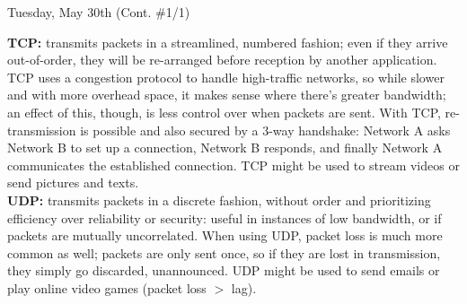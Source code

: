 \documentclass[11pt]{article}
\begin{document}
\begin{bloodorangebox}{Tuesday, May 30th (Cont. \#1/1)\vspace{-2em}\begin{flushright}\large{}\end{flushright}}
\begin{multicols}{2}
        \scriptsize\textbf{TCP:} transmits packets in a streamlined, numbered fashion; even if they arrive out-of-order, they will be re-arranged before reception by another application. TCP uses a congestion protocol to handle high-traffic networks, so while slower and with more overhead space, it makes sense where there's greater bandwidth; an effect of this, though, is less control over when packets are sent. With TCP, re-transmission is possible and also secured by a 3-way handshake: Network A asks Network B to set up a connection, Network B responds, and finally Network A communicates the established connection. TCP might be used to stream videos or send pictures and texts. \\
        \hline
        \vspace{0.75em}
        \scriptsize\textbf{UDP:} transmits packets in a discrete fashion, without order and prioritizing efficiency over reliability or security: useful in instances of low bandwidth, or if packets are mutually uncorrelated. When using UDP, packet loss is much more common as well; packets are only sent once, so if they are lost in transmission, they simply go discarded, unannounced. UDP might be used to send emails or play online video games (packet loss $>$ lag).
    \end{multicols}
\end{bloodorangebox}

\begin{center}
\hspace{0.2cm}
\vspace{-0.5em}
\end{center}
\end{document}

